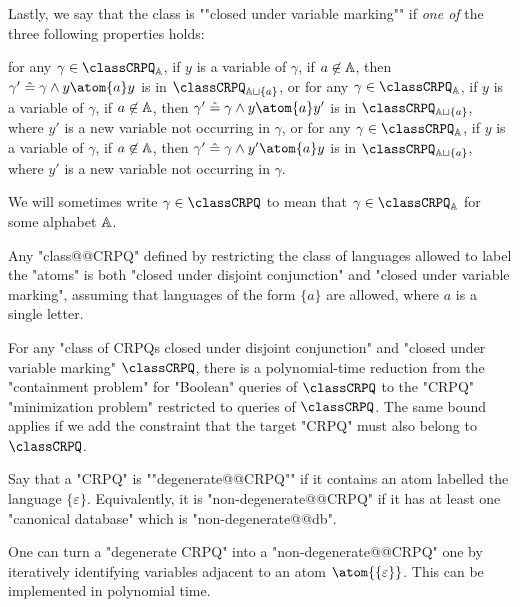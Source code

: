 Lastly, we say that the class is \AP""closed under variable marking""
if \emph{one of} the three following properties holds: 
\begin{description}
	\itemAP[\intro*\axiomVarMarkingLoop] for any $\gamma \in \classCRPQ_{\A}$, if $y$ is a variable of $\gamma$,
		if $a\not\in\mathbb{A}$, then $\gamma' \defeq \gamma \land y \atom{a} y$
		is in $\classCRPQ_{\A\sqcup\{a\}}$, or
	\itemAP[\intro*\axiomVarMarkingOut] for any $\gamma \in \classCRPQ_{\A}$, if $y$ is a variable of $\gamma$,	
		if $a\not\in\mathbb{A}$, then $\gamma' \defeq \gamma \land y \atom{a} y'$
		is in $\classCRPQ_{\A\sqcup\{a\}}$,
		where $y'$ is a new variable not occurring in $\gamma$, or
	\itemAP[\intro*\axiomVarMarkingIn] for any $\gamma \in \classCRPQ_{\A}$, if $y$ is a variable of $\gamma$,	
		if $a\not\in\mathbb{A}$, then $\gamma' \defeq \gamma \land y' \atom{a} y$
		is in $\classCRPQ_{\A\sqcup\{a\}}$,
		where $y'$ is a new variable not occurring in $\gamma$.
\end{description}

We will sometimes write $\gamma \in \classCRPQ$ to mean that $\gamma\in\classCRPQ_{\A}$
for some alphabet $\mathbb{A}$.

\begin{fact}
	Any "class@@CRPQ" defined by restricting the class of languages allowed to
	label the "atoms" is both "closed under disjoint conjunction" and "closed under variable marking", assuming that languages of
	the form $\{a\}$ are allowed, where $a$ is a single letter.
\end{fact}

\begin{theorem}
	\AP\label{thm:reduction-containment-to-variable-minimization}
	For any "class of CRPQs closed under disjoint conjunction" and
	"closed under variable marking"
	$\classCRPQ$, there is a polynomial-time reduction
	from the "containment problem" for "Boolean" queries of $\classCRPQ$ to the "CRPQ" 
	"minimization problem" restricted to queries of $\classCRPQ$. 
	The same bound applies if we add the constraint that the target "CRPQ" must also belong to $\classCRPQ$.
\end{theorem}

Say that a "CRPQ" is \AP""degenerate@@CRPQ"" if it contains an atom labelled the language $\{\varepsilon\}$.
Equivalently, it is "non-degenerate@@CRPQ" if it has at least one "canonical database"
which is "non-degenerate@@db".

\begin{fact}
	\AP\label{fact:produce-non-degenerate}
	One can turn a "degenerate CRPQ" into a "non-degenerate@@CRPQ" one by
	iteratively identifying variables adjacent to an atom $\atom{\{\varepsilon\}}$.
	This can be implemented in polynomial time.
\end{fact}


